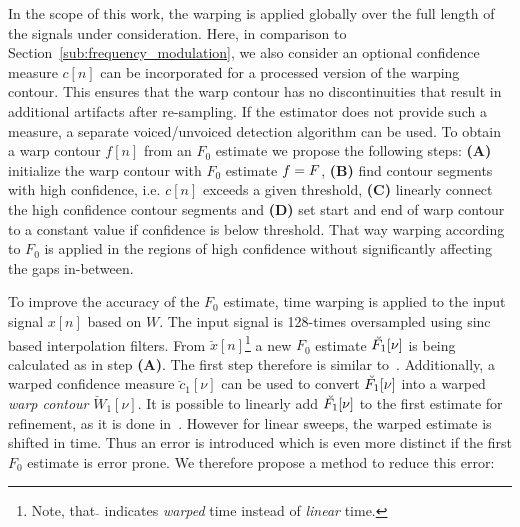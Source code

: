 
In the scope of this work, the warping is applied globally over the full length of the signals under consideration. Here, in comparison to Section~\ref{sub:frequency_modulation}, we also consider an optional confidence measure $c[n]$ can be incorporated for a processed version of the warping contour. This ensures that the warp contour has no discontinuities that result in additional artifacts after re-sampling. If the estimator does not provide such a measure, a separate voiced/unvoiced detection algorithm can be used. To obtain a warp contour $f[n]$ from an $F_0$ estimate we propose the following steps: \textbf{(A)} initialize the warp contour with $F_0$ estimate $f = {F}$, \textbf{(B)} find contour segments with high confidence, i.e. $c[n]$ exceeds a given threshold, \textbf{(C)} linearly connect the high confidence contour segments and \textbf{(D)} set start and end of warp contour to a constant value if confidence is below threshold. That way warping according to $F_0$ is applied in the regions of high confidence without significantly affecting the gaps in-between.
\par
To improve the accuracy of the $F_0$ estimate, time warping is applied to the input signal $x[n]$ based on $W$. The input signal is 128-times oversampled using sinc based interpolation filters.
From $\breve{x}[n]$\footnote{Note, that $\breve{}$ indicates \emph{warped} time instead of \emph{linear} time.} a new $F_0$ estimate $\breve{{F}_1}[\nu]$ is being calculated as in step \textbf{(A)}. The first step therefore is similar to~\cite{resch07}. Additionally, a warped confidence measure $\breve{c}_1[\nu]$ can be used to convert $\breve{{F}_1}[\nu]$ into a warped \emph{warp contour} $\breve{W}_1[\nu]$. It is possible to linearly add $\breve{{F}_1}[\nu]$ to the first estimate for refinement, as it is done in~\cite{azarov12}. However for linear sweeps, the warped estimate is shifted in time. Thus an error is introduced which is even more distinct if the first $F_0$ estimate is error prone. We therefore propose a method to reduce this error:
